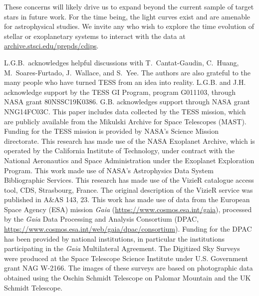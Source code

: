 \documentclass[12pt,twocolumn,tighten]{aastex62}
\newcommand{\stscilink}{\url{archive.stsci.edu/prepds/cdips}}
\begin{document}
These concerns will likely drive us to expand beyond the current
sample of target stars in future work.  For the time being, the
light curves exist and are amenable for astrophysical studies.  We
invite any who wish to explore the time evolution of stellar or
exoplanetary systems to interact with the data at \stscilink.



\acknowledgements
L.G.B.\ acknowledges helpful discussions with 
T.~Cantat-Gaudin,
C.~Huang,
M.~Soares-Furtado,
J.~Wallace, and
S.~Yee.  The authors are also
grateful to the many people who have turned TESS from an idea into
reality.
%
L.G.B. and J.H. acknowledge support by the TESS GI Program, program
G011103, through NASA grant 80NSSC19K0386.
%
G.B. acknowledges support through NASA grant NNG14FC03C.
%
This paper includes data collected by the TESS mission, which are
publicly available from the Mikulski Archive for Space Telescopes
(MAST).
%
Funding for the TESS mission is provided by NASA's Science Mission
directorate.
%
This research has made use of the NASA Exoplanet Archive, which is
operated by the California Institute of Technology, under contract
with the National Aeronautics and Space Administration under the
Exoplanet Exploration Program.
%
This work made use of NASA's Astrophysics Data System Bibliographic
Services.
%
This research has made use of the VizieR catalogue access tool, CDS,
Strasbourg, France. The original description of the VizieR service was
published in A\&AS 143, 23.
%
This work has made use of data from the European Space Agency (ESA)
mission {\it Gaia} (\url{https://www.cosmos.esa.int/gaia}), processed
by the {\it Gaia} Data Processing and Analysis Consortium (DPAC,
\url{https://www.cosmos.esa.int/web/gaia/dpac/consortium}). Funding
for the DPAC has been provided by national institutions, in particular
the institutions participating in the {\it Gaia} Multilateral
Agreement.
%
The Digitized Sky Surveys were produced at the Space Telescope Science
Institute under U.S. Government grant NAG W-2166. The images of these
surveys are based on photographic data obtained using the Oschin
Schmidt Telescope on Palomar Mountain and the UK Schmidt Telescope.
%
\newline
%
%
\end{document}
